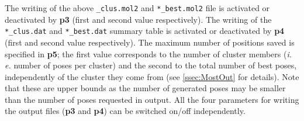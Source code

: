 \documentclass[a4paper,12pt,titlepage]{article}
\begin{document}
\par
The writing of the above {\tt *\_clus.mol2}  and \texttt{*\_best.mol2} file is activated or deactivated 
by {\bf p3} (first and second value respectively). The writing of the \texttt{*\_clus.dat} and \texttt{*\_best.dat} summary table is activated or deactivated by \textbf{p4} (first and second value respectively). 
The maximum number of positions saved is specified in \textbf{p5}; 
the first value corresponds to the number of cluster members 
(\textit{i. e.} number of poses per cluster) 
and the second to the total number of best poses, independently of the cluster they come from 
(see \ref{ssec:MostOut} for details). Note that these are upper bounds as the number of 
generated poses may be smaller
than the number of poses requested in output. 
All the four parameters for writing the output files (\textbf{p3} and \textbf{p4}) can be switched on/off independently.







\end{document}
